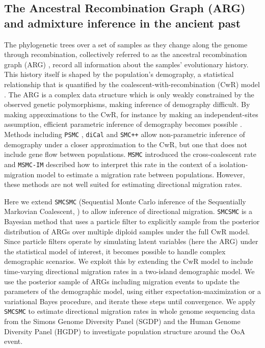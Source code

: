 \subsection{The Ancestral Recombination Graph (ARG) and admixture inference in the ancient past}

The phylogenetic trees over a set of samples as they change along the genome through recombination, collectively referred to as the ancestral recombination graph (ARG) \cite{Griffiths1997a,Rasmussen2014}, record all information about the samples' evolutionary history.  This history itself is shaped by the population's demography, a statistical relationship that is quantified by the coalescent-with-recombination (CwR) model \cite{Griffiths1997a}.  The ARG is a complex data structure which is only weakly constrained by the observed genetic polymorphisms, making inference of demography difficult. By making approximations to the CwR, for instance by making an independent-sites assumption, efficient parametric inference of demography becomes possible \cite{Excoffier2013,McVean2005}.  Methods including {\tt PSMC} \cite{Li2011}, {\tt diCal} \cite{Steinrucken2015} and {\tt SMC++} \cite{Terhorst2015} allow non-parametric inference of demography under a closer approximation to the CwR, but one that does not include gene flow between populations. {\tt MSMC} \cite{Schiffels2014} introduced the cross-coalescent rate and {\tt MSMC-IM} described how to interpret this rate in the context of a isolation-migration model to estimate a migration rate between populations\cite{Wang2019a}. However, these methods are not well suited for estimating directional migration rates. 

Here we extend {\tt SMCSMC} (Sequential Monte Carlo inference of the Sequentially Markovian Coalescent, \cite{Henderson2018}) to allow inference of directional migration.  {\tt SMCSMC} is a Bayesian method that uses a particle filter to explicitly sample from the posterior distribution of ARGs over multiple diploid samples under the full CwR model.
Since particle filters operate by simulating latent variables (here the ARG) under the statistical model of interest, it becomes possible to handle complex demographic scenarios.  We exploit this by extending the CwR model to include time-varying directional migration rates in a two-island demographic model.  We use the posterior sample of ARGs including migration events to update the parameters of the demographic model, using either expectation-maximization or a variational Bayes procedure, and iterate these steps until convergence.   We apply {\tt SMCSMC} to estimate directional migration rates in whole genome sequencing data from the Simons Genome Diversity Panel (SGDP) \cite{Mallick2016} and the Human Genome Diversity Panel (HGDP) \cite{Bergstrom2019} to investigate population structure around the OoA event.

